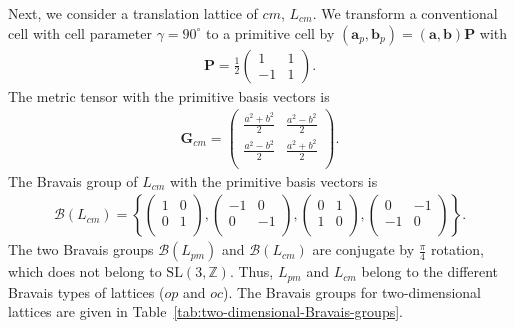 Next, we consider a translation lattice of $cm$, $L_{cm}$.
We transform a conventional cell with cell parameter $\gamma = 90^{\circ}$ to a primitive cell by $(\bm{a}_{p}, \bm{b}_{p}) = (\bm{a}, \bm{b}) \bm{P}$ with
\begin{align*}
  \bm{P} = \frac{1}{2} \begin{pmatrix} 1 & 1 \\ -1 & 1 \end{pmatrix}.
\end{align*}
The metric tensor with the primitive basis vectors is
\begin{align*}
  \bm{G}_{cm} = \begin{pmatrix}
    \frac{a^{2} + b^{2}}{2} & \frac{a^{2} - b^{2}}{2} \\
    \frac{a^{2} - b^{2}}{2} & \frac{a^{2} + b^{2}}{2} \\
  \end{pmatrix}.
\end{align*}
The Bravais group of $L_{cm}$ with the primitive basis vectors is
\begin{align}
  \label{eq:bravais_group_cm_general}
  \mathcal{B}(L_{cm}) = \left\{
    \begin{pmatrix} 1 & 0 \\ 0 & 1 \\ \end{pmatrix},
    \begin{pmatrix} -1 & 0 \\ 0 & -1 \\ \end{pmatrix},
    \begin{pmatrix} 0 & 1 \\ 1 & 0 \\ \end{pmatrix},
    \begin{pmatrix} 0 & -1 \\ -1 & 0 \\ \end{pmatrix}
  \right\}.
\end{align}
The two Bravais groups $\mathcal{B}(L_{pm})$ and $\mathcal{B}(L_{cm})$ are conjugate by $\frac{\pi}{4}$ rotation, which does not belong to $\mathrm{SL}(3, \mathbb{Z})$.
Thus, $L_{pm}$ and $L_{cm}$ belong to the different Bravais types of lattices ($op$ and $oc$).
The Bravais groups for two-dimensional lattices are given in Table~\ref{tab:two-dimensional-Bravais-groups}.

